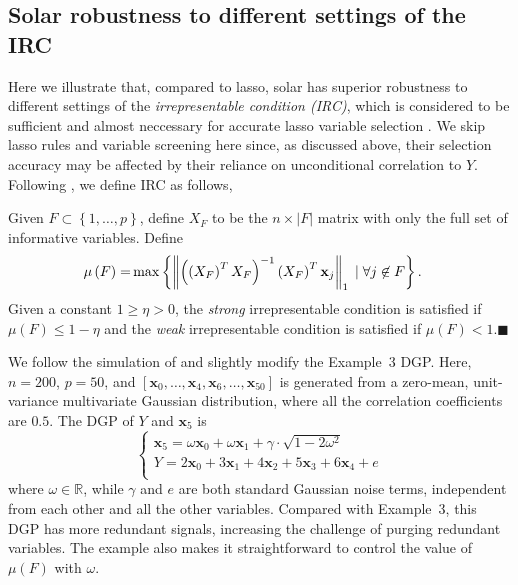 \documentclass[11pt,authoryear]{elsarticle}
\begin{document}

\subsection{Solar robustness to different settings of the IRC \label{subsection:irc}}

Here we illustrate that, compared to lasso, solar has superior robustness to different settings of the \emph{irrepresentable condition (IRC)}, which is considered to be sufficient and almost neccessary for accurate lasso variable selection \citep{zhang09}. We skip lasso rules and variable screening here since, as discussed above, their selection accuracy may be affected by their reliance on unconditional correlation to $Y$. Following \citet{zhang09}, we define IRC as follows,

\begin{definition}[IRC]
  Given $F \subset \left\{ 1, \ldots, p \right\}$, define $X_F$ to be the $n \times \left\vert F \right \vert$ matrix with only the full set of informative variables. Define
    \begin{align}
    \mu \left( F \right) = & \max \left\{ \left\Vert \left( \left( X_F \right)^T X_F \right)^{-1} \left( X_F \right)^T \mathbf{x}_j \right\Vert_1 \; \vert \; \forall j \not\in F \right\}. \notag
    \end{align}
  Given a constant $1 \geqslant \eta > 0$, the \emph{strong} irrepresentable condition is satisfied if $\mu \left( F \right) \leqslant 1 - \eta$ and the \emph{weak} irrepresentable condition is satisfied if $\mu \left( F \right) < 1$.$\blacksquare$
\end{definition}

\smallskip
We follow the simulation of \citet{zhaoyu06} and slightly modify the Example~3 DGP. Here, $n = 200$, $p = 50$, and $[\mathbf{x}_0, \ldots, \mathbf{x}_4, \mathbf{x}_6, \ldots, \mathbf{x}_{50}]$ is generated from a zero-mean, unit-variance multivariate Gaussian distribution, where all the correlation coefficients are $0.5$. The DGP of $Y$ and $\mathbf{x}_5$ is
\begin{equation}
	\begin{cases}
    \mathbf{x}_5 = \omega \mathbf{x}_0 + \omega \mathbf{x}_1 + \gamma\cdot \sqrt{1 - 2\omega^2} \\
    Y = 2 \mathbf{x}_0 + 3\mathbf{x}_1 + 4 \mathbf{x}_2 + 5 \mathbf{x}_3 + 6 \mathbf{x}_4 + e \\
	\end{cases}
	\label{eqn:dgp_x5}
\end{equation}
%
where $\omega \in \mathbb{R}$, while $\gamma$ and $e$ are both standard Gaussian noise terms, independent from each other and all the other variables. Compared with Example~3, this DGP has more redundant signals, increasing the challenge of purging redundant variables. The example also makes it straightforward to control the value of $\mu \left( F \right)$ with $\omega$.
\end{document}
